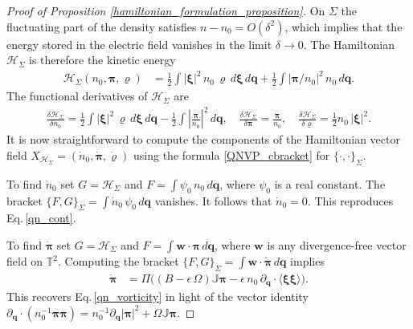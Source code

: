 \documentclass[%
 aip,
 amsmath,amssymb,
reprint, onecolumn %
]{revtex4-1}
\begin{document}
\begin{proof}[Proof of Proposition \ref{hamiltonian_formulation_proposition}]
On $\Sigma$ the fluctuating part of the density satisfies $n - n_0 = O(\delta^2)$, which implies that the energy stored in the electric field vanishes in the limit $\delta\rightarrow 0$. The Hamiltonian $\mathcal{H}_\Sigma$ is therefore the kinetic energy
\begin{align*}
\mathcal{H}_\Sigma(n_0,\bm{\pi},\varrho) & = \frac{1}{2}\int |\bm{\xi}|^2\,n_0\,\varrho\,d\bm{\xi}\,d\bm{q} + \frac{1}{2}\int|\bm{\pi}/n_0|^2\,n_0\,d\bm{q}.
\end{align*}
The functional derivatives of $\mathcal{H}_\Sigma$ are
\begin{gather*}
\frac{\delta\mathcal{H}_\Sigma}{\delta n_0} = \frac{1}{2}\int |\bm{\xi}|^2\,\varrho\,d\bm{\xi}\,d\bm{q} -\frac{1}{2}\int \left|\frac{\bm{\pi}}{n_0}\right|^2\,d\bm{q},\quad \frac{\delta\mathcal{H}_\Sigma}{\delta\bm{\pi}} = \frac{\bm{\pi}}{n_0},\quad \frac{\delta\mathcal{H}_\Sigma}{\delta \varrho} = \frac{1}{2}n_0\,|\bm{\xi}|^2.
\end{gather*}
It is now straightforward to compute the components of the Hamiltonian vector field $X_{\mathcal{H}_\Sigma} = (\dot{n}_0,\dot{\bm{\pi}},\dot{\varrho})$ using the formula \eqref{QNVP_cbracket} for $\{\cdot,\cdot\}_\Sigma$. 

To find $\dot{n}_0$ set $G = \mathcal{H}_\Sigma$ and $F = \int \psi_0\,n_0\,d\bm{q}$, where $\psi_0$ is a real constant. The bracket $\{F,G\}_{\Sigma} = \int \dot{n}_0\,\psi_0\,d\bm{q}$ vanishes. It follows that $\dot{n}_0 = 0$. This reproduces Eq.\,\eqref{qn_cont}.

To find $\dot{\bm{\pi}}$ set $G = \mathcal{H}_\Sigma$ and $F = \int \bm{w}\cdot\bm{\pi}\,d\bm{q}$, where $\bm{w}$ is any divergence-free vector field on $\mathbb{T}^2$. Computing the bracket $\{F,G\}_\Sigma = \int \bm{w}\cdot\dot{\bm{\pi}}\,d\bm{q}$  implies
\begin{align*}
\dot{\bm{\pi}} & = \Pi\bigg((B-\epsilon\,\Omega)\mathbb{J}{\bm{\pi}} - \epsilon\,n_0\,\partial_{\bm{q}}\cdot\langle\bm{\xi}\bm{\xi}\rangle\bigg).
\end{align*}
This recovers Eq.\,\eqref{qn_vorticity} in light of the vector identity $\partial_{\bm{q}}\cdot(n_0^{-1}\bm{\pi}\bm{\pi}) = n_0^{-1}\partial_{\bm{q}}|\bm{\pi}|^2 + \Omega\mathbb{J}\bm{\pi}.$


\end{proof}
\end{document}
